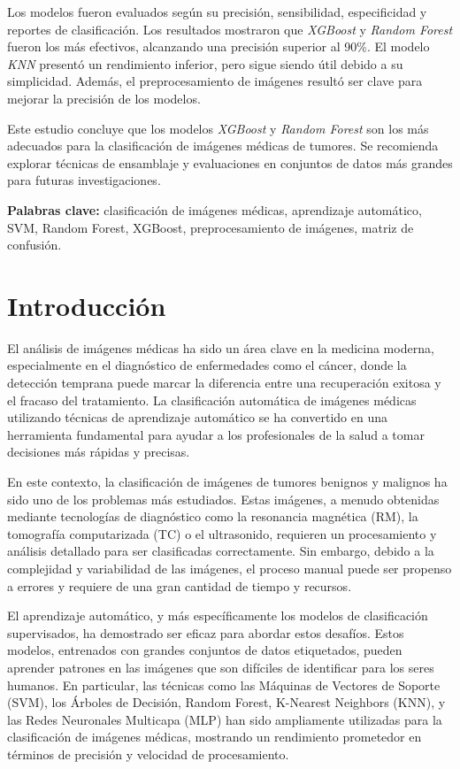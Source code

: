 \documentclass[12pt]{article}
\begin{document}
Los modelos fueron evaluados según su precisión, sensibilidad, especificidad y reportes de clasificación. Los resultados mostraron que \textit{XGBoost} y \textit{Random Forest} fueron los más efectivos, alcanzando una precisión superior al 90\%. El modelo \textit{KNN} presentó un rendimiento inferior, pero sigue siendo útil debido a su simplicidad. Además, el preprocesamiento de imágenes resultó ser clave para mejorar la precisión de los modelos.

Este estudio concluye que los modelos \textit{XGBoost} y \textit{Random Forest} son los más adecuados para la clasificación de imágenes médicas de tumores. Se recomienda explorar técnicas de ensamblaje y evaluaciones en conjuntos de datos más grandes para futuras investigaciones.

\textbf{Palabras clave:} clasificación de imágenes médicas, aprendizaje automático, SVM, Random Forest, XGBoost, preprocesamiento de imágenes, matriz de confusión.

\section{Introducción}
El análisis de imágenes médicas ha sido un área clave en la medicina moderna, especialmente en el diagnóstico de enfermedades como el cáncer, donde la detección temprana puede marcar la diferencia entre una recuperación exitosa y el fracaso del tratamiento. La clasificación automática de imágenes médicas utilizando técnicas de aprendizaje automático se ha convertido en una herramienta fundamental para ayudar a los profesionales de la salud a tomar decisiones más rápidas y precisas.

En este contexto, la clasificación de imágenes de tumores benignos y malignos ha sido uno de los problemas más estudiados. Estas imágenes, a menudo obtenidas mediante tecnologías de diagnóstico como la resonancia magnética (RM), la tomografía computarizada (TC) o el ultrasonido, requieren un procesamiento y análisis detallado para ser clasificadas correctamente. Sin embargo, debido a la complejidad y variabilidad de las imágenes, el proceso manual puede ser propenso a errores y requiere de una gran cantidad de tiempo y recursos.

El aprendizaje automático, y más específicamente los modelos de clasificación supervisados, ha demostrado ser eficaz para abordar estos desafíos\cite{litjens2017survey}. Estos modelos, entrenados con grandes conjuntos de datos etiquetados, pueden aprender patrones en las imágenes que son difíciles de identificar para los seres humanos. En particular, las técnicas como las Máquinas de Vectores de Soporte (SVM), los Árboles de Decisión, Random Forest, K-Nearest Neighbors (KNN), y las Redes Neuronales Multicapa (MLP) han sido ampliamente utilizadas para la clasificación de imágenes médicas, mostrando un rendimiento prometedor en términos de precisión y velocidad de procesamiento.
\end{document}
